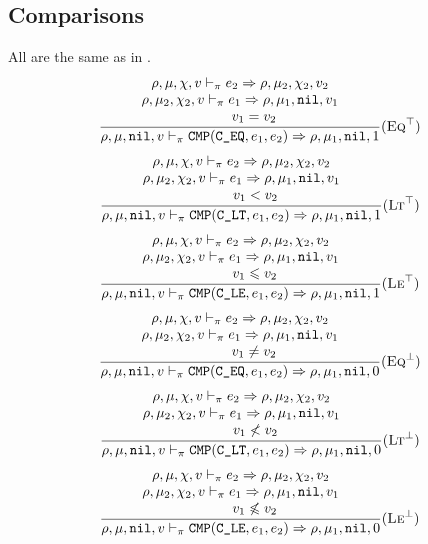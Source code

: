 \subsection{Comparisons}
All are the same as in \Cmm.
\[\dfrac{\begin{array}{c}
    \rho,\mu,\chi,v \vdash_\pi e_2\Rightarrow \rho,\mu_2,\chi_2,v_2 \\
    \rho,\mu_2,\chi_2,v \vdash_\pi e_1\Rightarrow \rho,\mu_1,\texttt{nil},v_1 \\
    \qquad v_1 = v_2
\end{array}}{\rho,\mu,\texttt{nil},v \vdash_\pi \texttt{CMP}(\texttt{C\_EQ}, e_1, e_2) \Rightarrow \rho,\mu_1,\texttt{nil},1}(\textsc{Eq}^\top)\]
\[\dfrac{\begin{array}{c}
    \rho,\mu,\chi,v \vdash_\pi e_2\Rightarrow \rho,\mu_2,\chi_2,v_2 \\
    \rho,\mu_2,\chi_2,v \vdash_\pi e_1\Rightarrow \rho,\mu_1,\texttt{nil},v_1 \\
    \qquad v_1 < v_2
\end{array}}{\rho,\mu,\texttt{nil},v \vdash_\pi \texttt{CMP}(\texttt{C\_LT}, e_1, e_2) \Rightarrow \rho,\mu_1,\texttt{nil},1}(\textsc{Lt}^\top)\]
\[\dfrac{\begin{array}{c}
    \rho,\mu,\chi,v \vdash_\pi e_2\Rightarrow \rho,\mu_2,\chi_2,v_2 \\
    \rho,\mu_2,\chi_2,v \vdash_\pi e_1\Rightarrow \rho,\mu_1,\texttt{nil},v_1 \\
    \qquad v_1 \leqslant v_2
\end{array}}{\rho,\mu,\texttt{nil},v \vdash_\pi \texttt{CMP}(\texttt{C\_LE}, e_1, e_2) \Rightarrow \rho,\mu_1,\texttt{nil},1}(\textsc{Le}^\top)\]
\[\dfrac{\begin{array}{c}
    \rho,\mu,\chi,v \vdash_\pi e_2\Rightarrow \rho,\mu_2,\chi_2,v_2 \\
    \rho,\mu_2,\chi_2,v \vdash_\pi e_1\Rightarrow \rho,\mu_1,\texttt{nil},v_1 \\
    \qquad v_1 \ne v_2
\end{array}}{\rho,\mu,\texttt{nil},v \vdash_\pi \texttt{CMP}(\texttt{C\_EQ}, e_1, e_2) \Rightarrow \rho,\mu_1,\texttt{nil},0}(\textsc{Eq}^\bot)\]
\[\dfrac{\begin{array}{c}
    \rho,\mu,\chi,v \vdash_\pi e_2\Rightarrow \rho,\mu_2,\chi_2,v_2 \\
    \rho,\mu_2,\chi_2,v \vdash_\pi e_1\Rightarrow \rho,\mu_1,\texttt{nil},v_1 \\
    \qquad v_1 \not< v_2
\end{array}}{\rho,\mu,\texttt{nil},v \vdash_\pi \texttt{CMP}(\texttt{C\_LT}, e_1, e_2) \Rightarrow \rho,\mu_1,\texttt{nil},0}(\textsc{Lt}^\bot)\]
\[\dfrac{\begin{array}{c}
    \rho,\mu,\chi,v \vdash_\pi e_2\Rightarrow \rho,\mu_2,\chi_2,v_2 \\
    \rho,\mu_2,\chi_2,v \vdash_\pi e_1\Rightarrow \rho,\mu_1,\texttt{nil},v_1 \\
    \qquad v_1 \not\leqslant v_2
\end{array}}{\rho,\mu,\texttt{nil},v \vdash_\pi \texttt{CMP}(\texttt{C\_LE}, e_1, e_2) \Rightarrow \rho,\mu_1,\texttt{nil},0}(\textsc{Le}^\bot)\]

